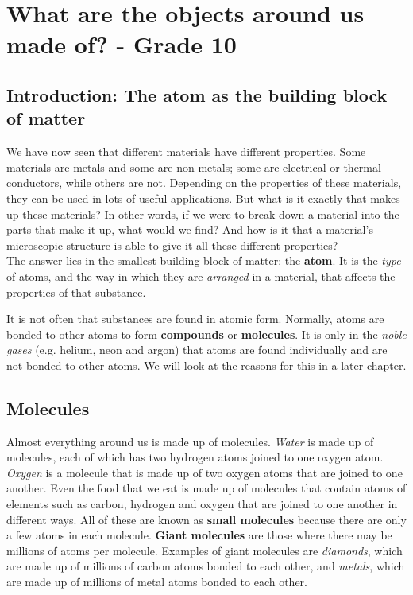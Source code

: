 
\chapter{What are the objects around us made of? - Grade 10}
\label{chap:micro}

\section{Introduction: The atom as the building block of matter}
\label{sec:micro:intro}

We have now seen that different materials have different properties. Some materials are metals and some are non-metals; some are electrical or thermal conductors, while others are not. Depending on the properties of these materials, they can be used in lots of useful applications. But what is it exactly that makes up these materials? In other words, if we were to break down a material into the parts that make it up, what would we find? And how is it that a material's microscopic structure is able to give it all these different properties?\\

The answer lies in the smallest building block of matter: the \textbf{atom}. It is the \textit{type} of atoms, and the way in which they are \textit{arranged} in a material, that affects the properties of that substance. 

It is not often that substances are found in atomic form. Normally, atoms are bonded to other atoms to form \textbf{compounds} or \textbf{molecules}. It is only in the \textit{noble gases} (e.g. helium, neon and argon) that atoms are found individually and are not bonded to other atoms. We will look at the reasons for this in a later chapter. 

\section{Molecules}
\label{sec:micro:molecules}


Almost everything around us is made up of molecules. \textit{Water} is made up of molecules, each of which has two hydrogen atoms joined to one oxygen atom. \textit{Oxygen} is a molecule that is made up of two oxygen atoms that are joined to one another. Even the food that we eat is made up of molecules that contain atoms of elements such as carbon, hydrogen and oxygen that are joined to one another in different ways. All of these are known as \textbf{small molecules} because there are only a few atoms in each molecule. \textbf{Giant molecules} are those where there may be millions of atoms per molecule. Examples of giant molecules are \textit{diamonds}, which are made up of millions of carbon atoms bonded to each other, and \textit{metals}, which are made up of millions of metal atoms bonded to each other.

